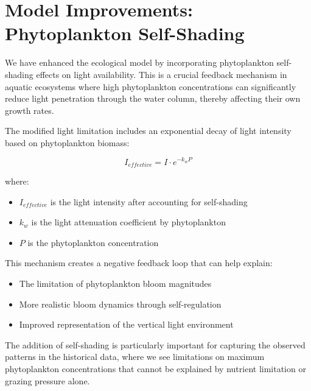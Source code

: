 \section{Model Improvements: Phytoplankton Self-Shading}

We have enhanced the ecological model by incorporating phytoplankton self-shading effects on light availability. This is a crucial feedback mechanism in aquatic ecosystems where high phytoplankton concentrations can significantly reduce light penetration through the water column, thereby affecting their own growth rates.

The modified light limitation includes an exponential decay of light intensity based on phytoplankton biomass:

\[ I_{effective} = I \cdot e^{-k_w P} \]

where:
\begin{itemize}
\item $I_{effective}$ is the light intensity after accounting for self-shading
\item $k_w$ is the light attenuation coefficient by phytoplankton
\item $P$ is the phytoplankton concentration
\end{itemize}

This mechanism creates a negative feedback loop that can help explain:
\begin{itemize}
\item The limitation of phytoplankton bloom magnitudes
\item More realistic bloom dynamics through self-regulation
\item Improved representation of the vertical light environment
\end{itemize}

The addition of self-shading is particularly important for capturing the observed patterns in the historical data, where we see limitations on maximum phytoplankton concentrations that cannot be explained by nutrient limitation or grazing pressure alone.
